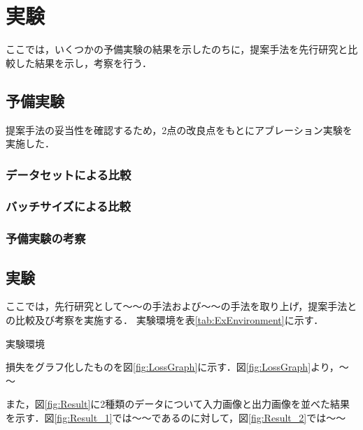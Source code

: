 \chapter{実験}\label{sec:Experiments}
ここでは，いくつかの予備実験の結果を示したのちに，提案手法を先行研究と比較した結果を示し，考察を行う．

\section{予備実験}\label{sec:PreExperiments}
提案手法の妥当性を確認するため，2点の改良点をもとにアブレーション実験を実施した．

\subsection{データセットによる比較}\label{sec:PreEx_Dataset}

\subsection{バッチサイズによる比較}\label{sec:PreEx_Batchsize}

\subsection{予備実験の考察}\label{sec:PreEx_consideration}

\section{実験}\label{sec:Experiment} %

ここでは，先行研究として～～の手法\cite{ref:yao2017integrated}および～～の手法\cite{ref:nomura2022uwb}を取り上げ，提案手法との比較及び考察を実施する．
実験環境を表\ref{tab:ExEnvironment}に示す．

\begin{table}[htbp]
    \centering
    \caption{実験環境} %
    \label{tab:ExEnvironment} %
\end{table}

損失をグラフ化したものを図\ref{fig:LossGraph}に示す．図\ref{fig:LossGraph}より，～～

また，図\ref{fig:Result}に2種類のデータについて入力画像と出力画像を並べた結果を示す．図\ref{fig:Result_1}では～～であるのに対して，図\ref{fig:Result_2}では～～

